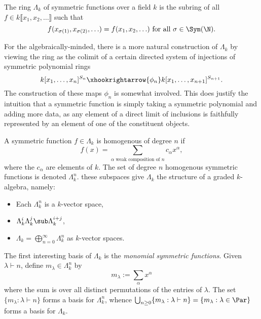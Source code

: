 \documentclass[12pt]{article}
\begin{document}
\begin{definition}\label{def:symfunc}
    The ring $ \Lambda_{k} $ of symmetric functions over a field $ k $ is the subring of all $ f\in k\llbracket x_{1}, x_{2}, \ldots\rrbracket $ such that
    \[
      f(x_{\sigma(1)}, x_{\sigma(2)},\ldots) = f(x_{1},x_{2},\ldots) \text{ for all } \sigma\in \Sym(\N).
    \]
\end{definition}
\begin{remark}
    For the algebraically-minded, there is a more natural construction of $ \Lambda_{k} $ by viewing the ring as the colimit of a certain directed system of injections of symmetric polynomial rings
    \[
      k[x_{1},\ldots,x_{n}]^{S_{n}} \xhookrightarrow{\phi_{n}} k[x_{1},\ldots,x_{n+1}]^{S_{n+1}}.
    \]
    The construction of these maps $ \phi_{n} $ is somewhat involved. This does justify the intuition that a symmetric function is simply taking a symmetric polynomial and adding more data, as any element of a direct limit of inclusions is faithfully represented by an element of one of the constituent objects.

\end{remark}
\begin{definition}
    A symmetric function $ f\in \Lambda_{k} $ is homogenous of degree $ n $ if 
    \[
      f(x) = \sum_{\alpha\text{ weak composition of }n}c_{\alpha} x^{\alpha},
    \]
    where the $ c_{\alpha} $ are elements of $ k $. The set of degree $ n $ homogenous symmetric functions is denoted $ \Lambda_{k}^{n} $. these subspaces give $ \Lambda_{k} $ the structure of a graded $ k $-algebra, namely:
\end{definition}

\begin{itemize}
  \item Each $ \Lambda_{k}^{n} $ is a $ k $-vector space,
  \item $ \Lambda_{k}^{i} \Lambda_{k}^{j}\sub \Lambda_{k}^{i+j} $,
  \item $ \Lambda_{k}=\bigoplus_{n=0}^{\infty} \Lambda_{k}^{n} $ as $ k $-vector spaces.
\end{itemize}
The first interesting basis of $ \Lambda_{k} $ is the \textit{monomial symmetric functions}. Given $ \lambda\vdash n $, define $ m_{\lambda}\in \Lambda_{k}^{n} $ by 
\[
  m_{\lambda}:= \sum_{\alpha} x^{\alpha}
\]
where the sum is over all distinct permutations of the entries of $ \lambda $. The set $ \{m_{\lambda}: \lambda\vdash n\} $ forms a basis for $ \Lambda_{k}^{n} $, whence $\bigcup_{n\geq0} \{m_{\lambda}: \lambda\vdash n\} = \{m_{\lambda}: \lambda\in\Par\} $ forms a basis for $ \Lambda_{k} $.
\end{document}
